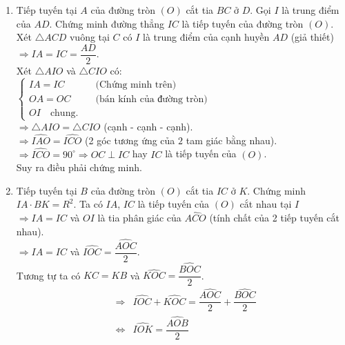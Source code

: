 \begin{bt}
{\begin{enumerate}
\begin{eqnarray*}
				& \Leftrightarrow & {CH}^2 = AC \cdot \cos A \cdot BC \cdot \sin A\\
				& \Leftrightarrow & {CH}^2 = AC\cdot BC\cdot \sin A\cdot \cos A\\
				& \Rightarrow & \text{Điều phải chứng minh.}
			\end{eqnarray*}
			\item Tiếp tuyến tại $A$ của đường tròn $(O)$ cắt tia $BC$ ở $D$. Gọi $I$ là trung điểm của $AD$. Chứng minh đường thẳng $IC$ là tiếp tuyến của đường tròn $(O)$.\\
			Xét $\triangle ACD$ vuông tại $C$ có $I$ là trung điểm của cạnh huyền $AD$ (giả thiết)\\
			$\Rightarrow IA = IC = \dfrac{AD}{2}$.\\
			Xét $\triangle AIO$ và $\triangle CIO$ có:\\
			$\begin{cases}
			IA = IC & \quad \text{(Chứng minh trên)}\\
			OA = OC & \quad \text{(bán kính của đường tròn)}\\
			OI \quad \text{chung}.
			\end{cases}$\\
			$\Rightarrow \triangle AIO = \triangle CIO $ (cạnh - cạnh - cạnh).\\
			$\Rightarrow \widehat{IAO} = \widehat{ICO}$ (2 góc tương ứng của $2$ tam giác bằng nhau).\\
			$\Rightarrow \widehat{ICO} = 90^\circ \Rightarrow OC \perp IC$ hay $IC$ là tiếp tuyến của $(O)$.\\
			Suy ra điều phải chứng minh.
			\item Tiếp tuyến tại $B$ của đường tròn $(O)$ cắt tia $IC$ ở $K$. Chứng minh $IA\cdot BK=R^2$.
			Ta có $IA$, $IC$ là tiếp tuyến của $(O)$ cắt nhau tại $I$\\ 
			$\Rightarrow IA=IC$ và $OI$ là tia phân giác của $\widehat {ACO}$ (tính chất của 2 tiếp tuyến cắt nhau).\\
			$\Rightarrow IA=IC$ và $\widehat{IOC} = \dfrac{\widehat{AOC}}{2}$.\\
			Tương tự ta có $KC = KB$ và $\widehat{KOC} = \dfrac{\widehat{BOC}}{2}$.\\
			\begin{eqnarray*}
				& \Rightarrow & \widehat{IOC} + \widehat{KOC} = \dfrac{\widehat{AOC}}{2} + \dfrac{\widehat{BOC}}{2} \\
				& \Leftrightarrow & \widehat{IOK} = \dfrac{\widehat{AOB}}{2}\\

\end{eqnarray*}
\end{enumerate}}
\end{bt}
